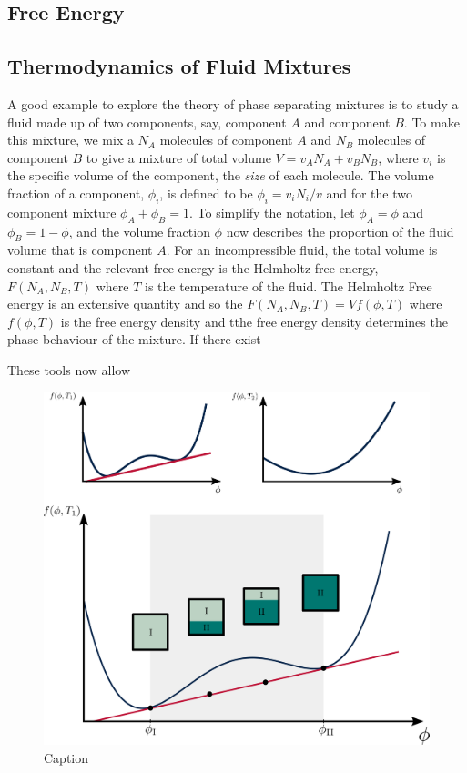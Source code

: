 \subsection{Free Energy}
\subsection{Thermodynamics of Fluid Mixtures}

A good example to explore the theory of phase separating mixtures is to study a fluid made up of two components, say, component $A$ and component $B$. To make this mixture, we mix a $N_A$ molecules of component $A$ and $N_B$ molecules of component $B$ to give a mixture of total volume $V = v_A N_A + v_B N_B$, where $v_i$ is the specific volume of the component, the \textit{size} of each molecule. The volume fraction of a component, $\phi_i$, is defined to be $\phi_i = v_i N_i/v$ and for the two component mixture $\phi_A+\phi_B = 1$. To simplify the notation, let $\phi_A=\phi$ and $\phi_B=1-\phi$, and the volume fraction $\phi$ now describes the proportion of the fluid volume that is component $A$. For an incompressible fluid, the total volume is constant and the relevant free energy is the Helmholtz free energy, $F(N_A, N_B, T)$ where $T$ is the temperature of the fluid. The Helmholtz Free energy is an extensive quantity and so the $F(N_A, N_B, T) = V f(\phi, T)$ where $f(\phi, T)$ is the free energy density and tthe free energy density determines the phase behaviour of the mixture. If there exist

These tools now allow 

\begin{figure}
    \centering
    \includegraphics{figures/thermo_solutions.svg}
    \caption{Caption}
    \label{fig:enter-label}
\end{figure}

